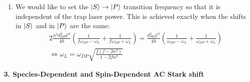\documentclass{article}
\theoremstyle{definition}
\newcommand{\f}[2]{\frac{#1}{#2}}
\newcommand{\lp}{\left(}
\newcommand{\rp}{\right)}
\begin{document}
\begin{enumerate}[label=(\alph*)]
\begin{enumerate}[label=(\roman*)]
		\item We would like to set the $\ket{S}\to \ket{P}$ transition frequency so that it is independent of the trap laser power. This is achieved exactly when the shifts in $\ket{S}$ and in $\ket{P}$ are the same:
		\begin{align*}
		&2\f{n^2d_{DP}^2\mathcal{E}^2}{4\hbar}\lp \f{1}{f\omega_{DP} - \omega_L} + \f{1}{f\omega_{DP} + \omega_L} \rp = \f{d_{PD}^2 \mathcal{E}^2}{4\hbar}\lp \f{1}{\omega_{DP} - \omega_L} + \f{1}{\omega_{DP} + \omega_L} \rp\\
		&\iff \boxed{\omega_L = \omega_{DP} \sqrt{\f{f(f-2n^2)}{1-2fn^2}}  }
		\end{align*}
		
		
	\end{enumerate}
\end{enumerate}


\noindent \textbf{3. Species-Dependent and Spin-Dependent AC Stark shift}	
	
\end{document}
